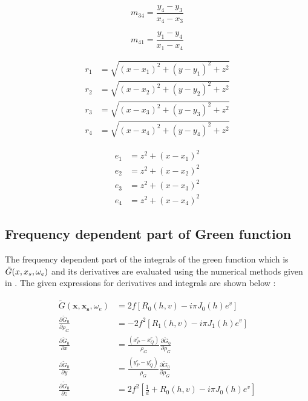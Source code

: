 \noindent\begin{minipage}{.5\linewidth}
    \begin{equation}
        m_{34} =\frac{y_4-y_3}{x_4-x_3}
    \end{equation}
    \end{minipage}%
    \begin{minipage}{.5\linewidth}
    \begin{equation}
        m_{41} =\frac{y_1-y_4}{x_1-x_4}
    \end{equation}
\end{minipage}


\begin{align}
    r_1 &= \sqrt{(x-x_1)^2+(y-y_1)^2+z^2}\\
    r_2 &= \sqrt{(x-x_2)^2+(y-y_2)^2+z^2}\\
    r_3 &= \sqrt{(x-x_3)^2+(y-y_3)^2+z^2}\\
    r_4 &= \sqrt{(x-x_4)^2+(y-y_4)^2+z^2}
\end{align}

\begin{align}
    e_1 &= z^2+(x-x_1)^2\\
    e_2 &= z^2+(x-x_2)^2\\
    e_3 &= z^2+(x-x_3)^2\\
    e_4 &= z^2+(x-x_4)^2
\end{align}

\subsection{Frequency dependent part of Green function}
The frequency dependent part of the integrals of the green function which is $\Tilde{G}(x, x_s, \omega_e)$ and its derivatives are 
evaluated using the numerical methods given in \cite{telste1986numerical}. The given expressions for derivatives and integrals are shown below : 

\begin{align}
    \tilde{G}(\boldsymbol{x},\boldsymbol{x_s}, \omega_e) &= 2f\left[ R_0(h,v) - i \pi J_0(h)e^{v}\right]\\
    \frac{\partial{\tilde{G}_0}}{\partial{\rho_G}} &= -2f^{2}\left[R_1(h,v)-i\pi J_{1}(h)e^v\right]\\
    \frac{\partial{\tilde{G}_0}}{\partial{x}} &=\frac{(x^e_P-x^e_Q)}{\rho_G}\frac{\partial{\tilde{G}_0}}{\partial{\rho_G}}\\
    \frac{\partial \tilde{G}_{0}}{\partial y} &= \frac{\left(y^e_P-y^e_Q\right)}{\rho_G} \frac{\partial \tilde{G}_{0}}{\partial \rho_G}\\
    \frac{\partial \tilde{G}_{0}}{\partial z} &= 2 f^{2}\left[\frac{1}{d}+R_{0}(h, v)-i \pi J_{0}(h) e^{v}\right]
\end{align}

